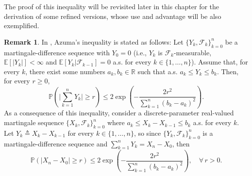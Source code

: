 \documentclass[12pt, oneside, a4paper]{article}
\theoremstyle{plain}
\theoremstyle{definition}
\newtheorem{rem}[thm]{Remark}
\def\reals{\mathbb{R}}
\def\pr{\ensuremath{\mathbb{P}}}
\def\expectation{\ensuremath{\mathbb{E}}}
\begin{document}
The proof of this inequality will be revisited later
in this chapter for the derivation of some refined versions,
whose use and advantage will be also exemplified.

\begin{rem}
In \cite[Theorem~3.13]{McDiarmid_tutorial}, Azuma's inequality is
stated as follows: Let $\{Y_k, \mathcal{F}_k\}_{k=0}^n$ be a
martingale-difference sequence with $Y_0=0$ (i.e., $Y_k$ is
$\mathcal{F}_k$-measurable, $\expectation[|Y_k|] < \infty$ and
$\expectation[Y_k| \mathcal{F}_{k-1}]=0$ a.s. for every $k \in
\{1, \ldots, n\}$). Assume that, for every $k$, there
exist some numbers $a_k, b_k \in \reals$ such that a.s.
$a_k \leq Y_k \leq b_k$. Then, for every $r \geq 0$,
\begin{equation}
\pr \left( \bigg|\sum_{k=1}^n Y_k\bigg| \geq r \right) \leq 2
\exp\left(-\frac{2r^2}{\sum_{k=1}^n (b_k-a_k)^2} \right).
\label{eq: concentration inequality for a martingale-difference
sequence (McDiarmid's tutorial)}
\end{equation}
As a consequence of this inequality, consider a discrete-parameter
real-valued martingale sequence $\{X_k, \mathcal{F}_k\}_{k=0}^n$
where $a_k \leq X_k - X_{k-1} \leq b_k$ a.s. for every $k$. Let $Y_k
\triangleq X_k - X_{k-1}$ for every $k \in \{1, \ldots, n\}$, so
since $\{Y_k, \mathcal{F}_k\}_{k=0}^n$ is a
martingale-difference sequence and $\sum_{k=1}^n Y_k = X_n - X_0$, then
\begin{equation}
\pr \left( |X_n - X_0| \geq r \right) \leq 2
\exp\left(-\frac{2r^2}{\sum_{k=1}^n (b_k-a_k)^2} \right), \quad \forall \, r > 0.
\label{eq: concentration inequality for a martingale sequence
(McDiarmid's tutorial)}
\end{equation}
\end{rem}
\end{document}
